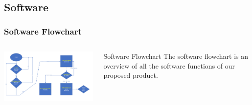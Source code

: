 \documentclass[aspectratio=169]{beamer}
\begin{document}
\subsection{Software}
\begin{frame}
    \frametitle{Software Flowchart}

    \begin{columns}
        \begin{column}{0.72\textwidth}
            \includegraphics[width=11cm]{SoftwareFlowchart}
        \end{column}

        \begin{column}{0.28\textwidth}
            \begin{block}{Software Flowchart}
                The software flowchart is an overview of all the software functions of our
                proposed product.
            \end{block}
        \end{column}
    \end{columns}


\end{frame}
\end{document}
